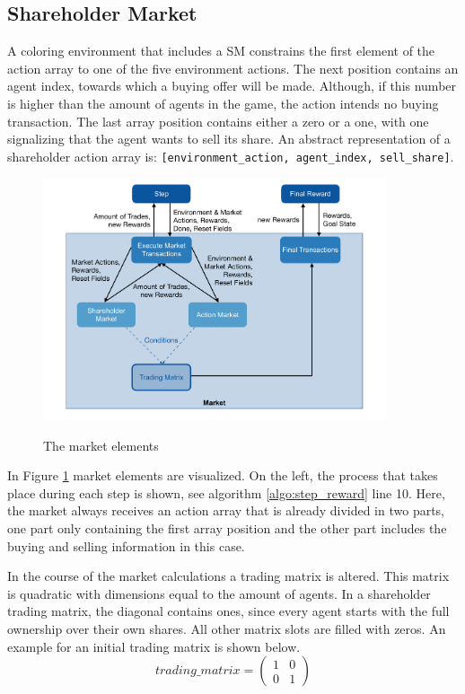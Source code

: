 \subsection{Shareholder Market}\label{shareholder_market}
A coloring environment that includes a SM constrains the first element of the action array to one of the five environment actions. The next position contains an agent index, towards which a buying offer will be made. Although, if this number is higher than the amount of agents in the game, the action intends no buying transaction. The last array position contains either a zero or a one, with one signalizing that the agent wants to sell its share. An abstract representation of a shareholder action array is: \verb|[environment_action, agent_index, sell_share]|.

\begin{figure}[hpbt]
    \centering
    \includegraphics[width=0.9\textwidth]{pictures/market}\\
    \caption[Market Elements]{The market elements}\label{fig:market}
\end{figure}

In Figure \ref{fig:market} market elements are visualized. On the left, the process that takes place during each step is shown, see algorithm \ref{algo:step_reward} line 10. Here, the market always receives an action array that is already divided in two parts, one part only containing the first array position and the other part includes the buying and selling information in this case.

In the course of the market calculations a trading matrix is altered. This matrix is quadratic with dimensions equal to the amount of agents. In a shareholder trading matrix, the diagonal contains ones, since every agent starts with the full ownership over their own shares. All other matrix slots are filled with zeros. An example for an initial trading matrix is shown below.
\begin{equation*}
trading\_matrix = 
\begin{pmatrix}
1 & 0 \\
0 & 1
\end{pmatrix}
\end{equation*}

